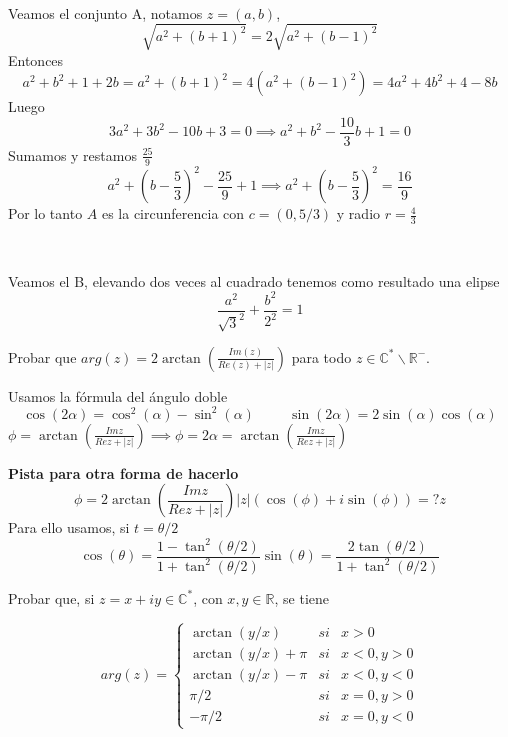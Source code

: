 \begin{sol}
	
	\
	
	Veamos el conjunto A, notamos $z=(a,b)$,
	$$ \sqrt{a^2+(b+1)^2} = 2\sqrt{a^2+(b-1)^2}$$
	Entonces $$a^2+b^2+1+2 b = a^2+(b+1)^2 = 4(a^2+(b-1)^2) = 4a^2+4b^2+4-8b$$
	Luego
	$$3a^2+3b^2-10b+3=0 \implies a^2+b^2-\frac{10}{3}b+1=0$$
	Sumamos y restamos $\frac{25}{9}$
	$$a^2+\left(b-\frac{5}{3}\right)^2-\frac{25}{9}+1 \implies a^2+(b-\frac{5}{3})^2=\frac{16}{9}$$
	Por lo tanto $A$ es la circunferencia con $c=(0,5/3)$ y radio $r=\frac{4}{3}$
	
	\
	
	Veamos el B, elevando dos veces al cuadrado tenemos como resultado una elipse
	$$ \frac{a^2}{\sqrt{3}^2} + \frac{b^2}{2^2} = 1 $$
\end{sol}



\begin{ejer}
	Probar que $arg(z) = 2\arctan\left( \frac{Im(z)}{Re(z) + |z|} \right)$ para todo  $z\in\mathbb{C}^{\ast}\backslash\mathbb{R}^{-}$.
\end{ejer}

\begin{sol}
	
	Usamos la fórmula del ángulo doble
	$$ \cos(2\alpha) = \cos^2(\alpha)-\sin^2(\alpha) \hspace{1cm} \sin(2\alpha) = 2\sin(\alpha)\cos(\alpha) $$
	$\phi = \arctan\left(\frac{Im z}{Re z + |z|}\right) \implies \phi = 2\alpha = \arctan\left(\frac{Im z}{Re z + |z|}\right) $
	
	\textbf{Pista para otra forma de hacerlo}
	$$ \phi = 2\arctan ( \frac{Im z}{Re z + |z|} ) 
	|z|(\cos(\phi)+i\sin(\phi)) =? z $$
	Para ello usamos, si $t=\theta/2$
	$$ \cos(\theta) = \frac{1-\tan^2(\theta/2)}{1+\tan^2(\theta/2)}
	\sin(\theta) = \frac{2\tan(\theta/2)}{1+\tan^2(\theta/2)} $$
\end{sol}


\begin{ejer}
	Probar que, si $z=x+iy\in\mathbb{C}^{\ast}$, con $x,y\in\mathbb{R}$, se tiene
	
	$$
	arg(z) = \left\{ 
	\begin{array}{lcc}
	\arctan(y/x) &   si  & x>0 \\
	\arctan(y/x) + \pi & si & x<0, y>0 \\
	\arctan(y/x)-\pi & si & x<0,y<0 \\
	\pi/2 & si & x=0,y>0 \\
	-\pi/2 & si & x=0,y<0 
	\end{array}
	\right.
	$$
\end{ejer}


